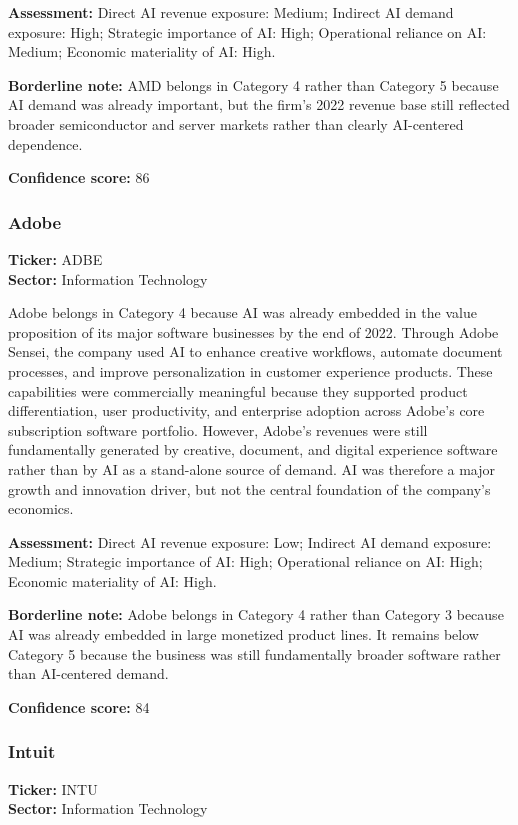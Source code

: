 \documentclass{article}
\begin{document}
\textbf{Assessment:} Direct AI revenue exposure: Medium; Indirect AI demand exposure: High; Strategic importance of AI: High; Operational reliance on AI: Medium; Economic materiality of AI: High.

\textbf{Borderline note:} AMD belongs in Category 4 rather than Category 5 because AI demand was already important, but the firm’s 2022 revenue base still reflected broader semiconductor and server markets rather than clearly AI-centered dependence.

\textbf{Confidence score:} 86

\subsubsection*{Adobe}
\textbf{Ticker:} ADBE \\
\textbf{Sector:} Information Technology

Adobe belongs in Category 4 because AI was already embedded in the value proposition of its major software businesses by the end of 2022. Through Adobe Sensei, the company used AI to enhance creative workflows, automate document processes, and improve personalization in customer experience products. These capabilities were commercially meaningful because they supported product differentiation, user productivity, and enterprise adoption across Adobe’s core subscription software portfolio. However, Adobe’s revenues were still fundamentally generated by creative, document, and digital experience software rather than by AI as a stand-alone source of demand. AI was therefore a major growth and innovation driver, but not the central foundation of the company’s economics.

\textbf{Assessment:} Direct AI revenue exposure: Low; Indirect AI demand exposure: Medium; Strategic importance of AI: High; Operational reliance on AI: High; Economic materiality of AI: High.

\textbf{Borderline note:} Adobe belongs in Category 4 rather than Category 3 because AI was already embedded in large monetized product lines. It remains below Category 5 because the business was still fundamentally broader software rather than AI-centered demand.

\textbf{Confidence score:} 84

\subsubsection*{Intuit}
\textbf{Ticker:} INTU \\
\textbf{Sector:} Information Technology
\end{document}
